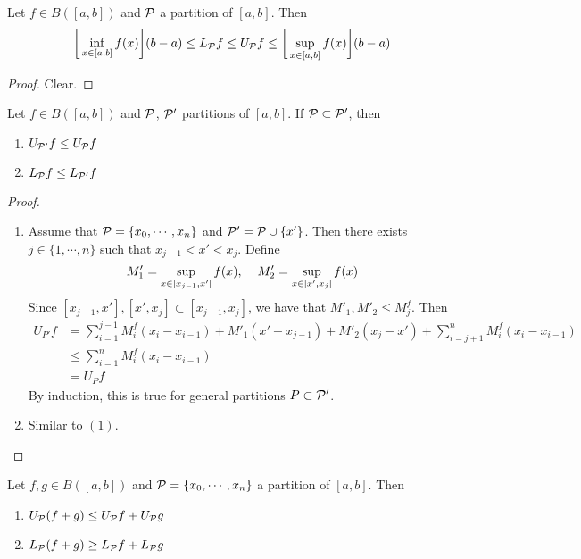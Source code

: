 \documentclass{book}
\begin{document}
	\begin{ex}  
		Let $f \in B([a,b])$ and $\mathcal{P}$ a partition of $[a,b]$. Then $$\bigg[\inf_{x \in [a,b]} f(x) \bigg] (b-a) \leq L_{\mathcal{P}} f \leq U_{\mathcal{P}} f \leq \bigg[ \sup_{x \in [a,b]} f(x)  \bigg] (b-a)$$
	\end{ex}

	\begin{proof}
		Clear.
	\end{proof}

	\begin{ex}  
			Let $f \in B([a,b])$ and $\mathcal{P}$, $\mathcal{P}'$ partitions of $[a,b]$. If $\mathcal{P} \subset \mathcal{P}'$, then 
			\begin{enumerate}
				\item $U_{\mathcal{P}'} f \leq U_{\mathcal{P}} f$
				\item $L_{\mathcal{P}} f \leq L_{\mathcal{P}'} f$
			\end{enumerate}
	\end{ex}

	\begin{proof} \
		\begin{enumerate}
			\item Assume that $\mathcal{P} = \{x_0, \cdots, x_n\}$ and $\mathcal{P}' = \mathcal{P} \cup \{x'\}$. Then there exists $j \in \{1, \cdots, n\}$ such that $x_{j-1} < x' < x_j$. Define $$M'_1 = \sup_{x \in [x_{j-1}, x']} f(x), \hspace{.4cm} M'_2 = \sup_{x \in [x', x_{j}]} f(x)$$
			Since $[x_{j-1}, x'], [x', x_j] \subset [x_{j-1}, x_j]$, we have that $M'_1, M'_2 \leq  M^f_j$. Then 
			\begin{align*}
				U_{P'}f 
				&= \sum_{i =1}^{j-1} M^f_i(x_i - x_{i-1}) + M'_1(x' - x_{j-1}) + M'_2(x_j - x') + \sum_{i =j+1}^n M^f_i(x_i - x_{i-1})  \\
				&\leq   \sum_{i =1}^{n} M^f_i(x_i - x_{i-1}) \\
				&= U_P f 
			\end{align*}
			By induction, this is true for general partitions $P \subset \mathcal{P}'$.
			\item Similar to $(1)$.
		\end{enumerate}
	\end{proof}

	\begin{ex}  
		Let $f, g \in B([a,b])$ and $\mathcal{P} = \{x_0, \cdots, x_n\}$ a partition of $[a,b]$. Then 
		\begin{enumerate}
			\item $U_{\mathcal{P}}(f+g) \leq U_{\mathcal{P}} f + U_{\mathcal{P}} g$
			\item $L_{\mathcal{P}}(f+g) \geq L_{\mathcal{P}} f + L_{\mathcal{P}} g$
		\end{enumerate}
	\end{ex}
\end{document}
